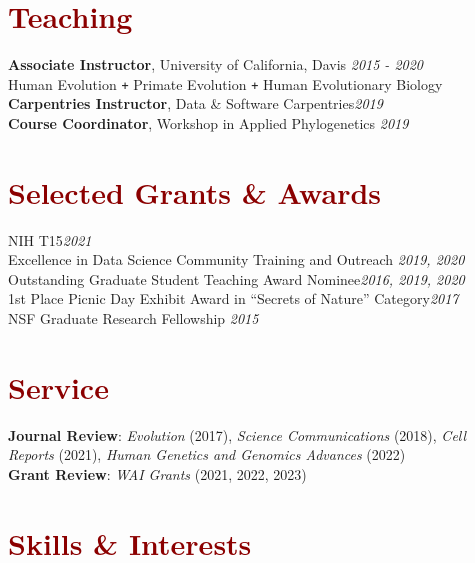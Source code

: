 \documentclass[11pt,margin,line]{resume}
\begin{document}
\begin{resume}
\section{\large\textcolor{DarkRed}{Teaching}}
\textbf{Associate Instructor}, University of California, Davis \hfill \emph{2015  - 2020}
\\Human Evolution \texttt{+} Primate Evolution \texttt{+} Human Evolutionary Biology
\\\textbf{Carpentries Instructor}, Data \& Software Carpentries\hfill \emph{2019}
\\\textbf{Course Coordinator}, Workshop in Applied Phylogenetics \hfill \emph{2019}

\section{\large\textcolor{DarkRed}{Selected Grants \& Awards}}
NIH T15\hfill \emph{2021}\\
Excellence in Data Science Community Training and Outreach \hfill \emph{2019, 2020}\\
Outstanding Graduate Student Teaching Award Nominee\hfill \emph{2016, 2019, 2020}\\
1st Place Picnic Day Exhibit Award in “Secrets of Nature” Category\hfill \emph{2017}\\
NSF Graduate Research Fellowship \hfill \emph{2015}\\

\vspace{-5mm}
\section{\large\textcolor{DarkRed}{Service}}
\textbf{Journal Review}: \emph{Evolution} (2017),  \emph{Science Communications} (2018),  \emph{Cell Reports} (2021), \emph{Human Genetics and Genomics Advances} (2022)\\
\textbf{Grant Review}: \emph{WAI Grants} (2021,  2022,  2023)

\section{\large\textcolor{DarkRed}{Skills \& Interests}}



\end{resume}
\end{document}
